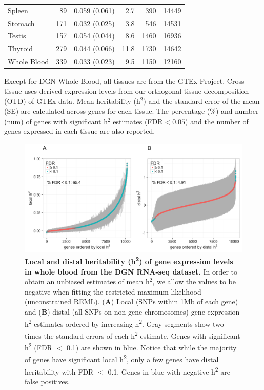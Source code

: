 \documentclass[10pt,letterpaper]{article}
\begin{document}
\begin{table}[!ht]
\begin{adjustwidth}{-2.25in}{0in}
\begin{tabular}{lrlrrr}
  Spleen & 89 & 0.059 (0.061) & 2.7 & 390 & 14449 \\ 
  Stomach & 171 & 0.032 (0.025) & 3.8 & 546 & 14531 \\ 
  Testis & 157 & 0.054 (0.044) & 8.6 & 1460 & 16936 \\ 
  Thyroid & 279 & 0.044 (0.066) & 11.8 & 1730 & 14642 \\ 
  Whole Blood & 339 & 0.033 (0.023) & 9.5 & 1150 & 12160 \\ 
   \hline
\end{tabular}
\begin{flushleft} Except for DGN Whole Blood, all tissues are from the GTEx Project. Cross-tissue uses derived expression levels from our orthogonal tissue decomposition (OTD) of GTEx data. Mean heritability (h$^2$) and the standard error of the mean (SE) are calculated across genes for each tissue. The percentage (\%) and number (num) of genes with significant h$^2$ estimates (FDR$<0.05$) and the number of genes expressed in each tissue are also reported.
\end{flushleft}
\label{table-h2}
\end{adjustwidth}
\end{table}

\clearpage

\begin{figure}[H]
\includegraphics[width=12cm]{Figures/Fig-DGN-jt-h2-UNCONSTRAINED.png}
\caption{{\bf  Local and distal heritability  (h\textsuperscript{2}) of gene expression levels in whole blood from the DGN RNA-seq dataset.} 
%
In order to obtain an unbiased estimates of mean h$^2$, we allow the values to be negative when fitting the restricted maximum likelihood (unconstrained REML). (\textbf{A}) Local (SNPs within 1Mb of each gene) and (\textbf{B}) distal (all SNPs on non-gene chromosomes) gene expression h\textsuperscript{2} estimates ordered by increasing h\textsuperscript{2}. Gray segments show two times the standard errors of each h\textsuperscript{2} estimate. Genes with significant h\textsuperscript{2} (FDR $<$ 0.1) are shown in blue. Notice that while the majority of genes have significant local h\textsuperscript{2}, only a few genes have distal heritability with FDR $<$ 0.1. Genes in blue with negative h\textsuperscript{2} are false positives.
}
\label{fig-dgn-jt-h2}
\end{figure}
\end{document}
